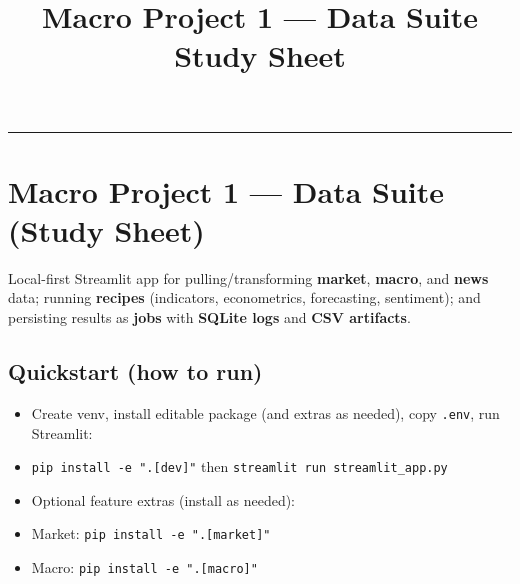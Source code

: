 \documentclass[11pt]{article}
\title{Macro Project 1 --- Data Suite\\Study Sheet}
\author{}
\date{}
\begin{document}
\maketitle

\tableofcontents
\vspace{0.5em}\noindent\rule{\textwidth}{0.4pt}\vspace{0.75em}


\section{Macro Project 1 — Data Suite (Study Sheet)}


Local-first Streamlit app for pulling/transforming \textbf{market}, \textbf{macro}, and \textbf{news} data; running \textbf{recipes} (indicators, econometrics, forecasting, sentiment); and persisting results as \textbf{jobs} with \textbf{SQLite logs} and \textbf{CSV artifacts}.


\subsection{Quickstart (how to run)}

\begin{itemize}[leftmargin=*,nosep]
\item Create venv, install editable package (and extras as needed), copy \texttt{.env}, run Streamlit:
\end{itemize}


\begin{itemize}[leftmargin=*,nosep]
\item \texttt{pip install -e ".[dev]"} then \texttt{streamlit run streamlit\_app.py}
\end{itemize}


\begin{itemize}[leftmargin=*,nosep]
\item Optional feature extras (install as needed):
\end{itemize}


\begin{itemize}[leftmargin=*,nosep]
\item Market: \texttt{pip install -e ".[market]"}
\end{itemize}


\begin{itemize}[leftmargin=*,nosep]
\item Macro: \texttt{pip install -e ".[macro]"}
\end{itemize}
\end{document}
